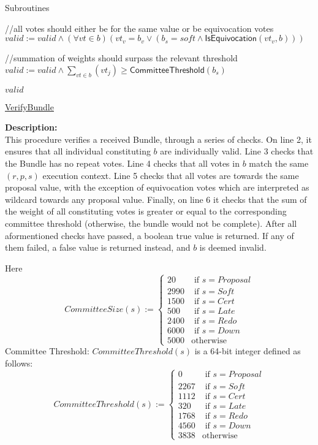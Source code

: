 \documentclass[10pt,a4paper]{article}
\begin{document}
\begin{section}{Subroutines}
\begin{algorithm}[H]
\begin{algorithmic}[1]
    //all votes should either be for the same value or be equivocation votes
    \State $valid := valid \land (\forall vt \in b)(vt_v = b_v \lor (b_s = soft \land \mathsf{IsEquivocation}(vt_v, b)))$

    //summation of weights should surpass the relevant threshold
    \State $valid := valid \land  \sum_{vt \in b}(vt_j) \geq \mathsf{CommitteeThreshold}(b_s)$

    \State \Return $valid$

    \EndFunction
    \end{algorithmic}
    \caption{\underline{VerifyBundle}}
\end{algorithm}

\noindent \textbf{Description:}\\
This procedure verifies a received Bundle, through a series 
of checks.
On line 2, it ensures that all individual constituting $b$
are individually valid.
Line 3 checks that the Bundle has no repeat votes.
Line 4 checks that all votes in $b$ match the same $(r,p,s)$
execution context.
Line 5 checks that all votes are towards the same proposal value,
with the exception of equivocation votes which are interpreted as wildcard
towards any proposal value.
Finally, on line 6 it checks that the sum of the weight of all constituting
votes is greater or equal to the corresponding committee threshold (otherwise, 
the bundle would not be complete).
After all aformentioned checks have passed, a boolean true value is returned.
If any of them failed, a false value is returned instead, and $b$ is deemed invalid.

Here
$$
CommitteeSize(s):= \left\{
\begin{array}{rl}
     20 & \text{ if }s = Proposal \\
   2990 & \text{ if }s = Soft \\
   1500 & \text{ if }s = Cert \\
    500 & \text{ if }s = Late \\
   2400 & \text{ if }s = Redo \\
   6000 & \text{ if }s = Down \\
   5000 & \text{otherwise}
\end{array}
\right.
$$
Committee Threshold: $CommitteeThreshold(s)$ is a 64-bit integer defined as follows:
$$
CommitteeThreshold(s):= \left\{
\begin{array}{rl}
     0 &  \text{ if }s = Proposal \\
  2267 &  \text{ if }s = Soft \\
  1112 &  \text{ if }s = Cert \\
   320 &  \text{ if }s = Late \\
  1768 &  \text{ if }s = Redo \\
  4560 &  \text{ if }s = Down \\
  3838 &  \text{otherwise}
\end{array}
\right.
$$


\end{section}
\end{document}
